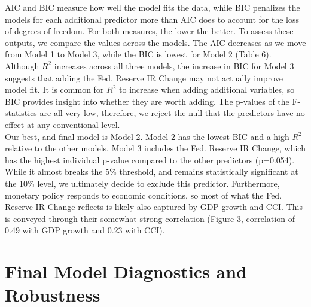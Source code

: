 \vspace{0.8em}
\indent AIC and BIC measure how well the model fits the data, while BIC penalizes the models for each additional predictor more than AIC does to account for the loss of degrees of freedom. For both measures, the lower the better. To assess these outputs, we compare the values across the models. The AIC decreases as we move from Model 1 to Model 3, while the BIC is lowest for Model 2 (Table 6). Although $R^2$ increases across all three models, the increase in BIC for Model 3 suggests that adding the Fed. Reserve IR Change may not actually improve model fit. It is common for $R^2$ to increase when adding additional variables, so BIC provides insight into whether they are worth adding. The p-values of the F-statistics are all very low, therefore, we reject the null that the predictors have no effect at any conventional level. \\
\indent Our best, and final model is Model 2. Model 2 has the lowest BIC and a high $R^2$ relative to the other models. Model 3 includes the Fed. Reserve IR Change, which has the highest individual p-value compared to the other predictors (p=0.054). While it almost breaks the 5\% threshold, and remains statistically significant at the 10\% level, we ultimately decide to exclude this predictor. Furthermore,  monetary policy responds to economic conditions, so most of what the Fed. Reserve IR Change reflects is likely also captured by GDP growth and CCI. This is conveyed through their somewhat strong correlation (Figure 3, correlation of 0.49 with GDP growth and 0.23 with CCI). 

\section{Final Model Diagnostics and Robustness}
